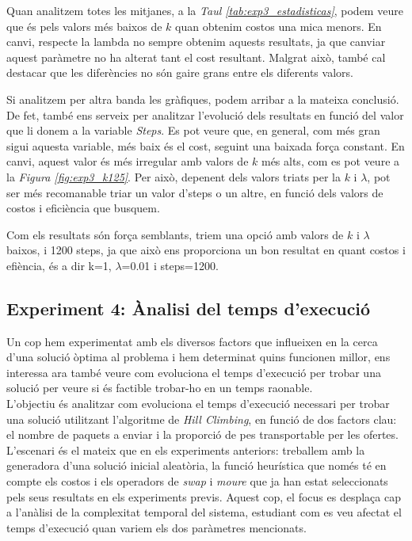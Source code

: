 \documentclass[a4paper]{article}
\begin{document}
	Quan analitzem totes les mitjanes, a la \textit{Taul \ref{tab:exp3_estadisticas}}, podem veure que és pels valors més baixos de $k$ quan obtenim costos una mica menors. En canvi, respecte la lambda no sempre obtenim aquests resultats, ja que canviar aquest paràmetre no ha alterat tant el cost resultant. Malgrat això, també cal destacar que les diferències no són gaire grans entre els diferents valors.
	
	Si analitzem per altra banda les gràfiques, podem arribar a la mateixa conclusió. De fet, també ens serveix per analitzar l'evolució dels resultats en funció del valor que li donem a la variable \textit{Steps}. Es pot veure que, en general, com més gran sigui aquesta variable, més baix és el cost, seguint una baixada força constant. En canvi, aquest valor és més irregular amb valors de $k$ més alts, com es pot veure a la \textit{Figura \ref{fig:exp3_k125}}. Per això, depenent dels valors triats per la $k$ i $\lambda$, pot ser més recomanable triar un valor d'steps o un altre, en funció dels valors de costos i eficiència que busquem.
	
	Com els resultats són força semblants, triem una opció amb valors de $k$ i $\lambda$ baixos, i 1200 steps, ja que això ens proporciona un bon resultat en quant costos i efiència, és a dir k=1, $\lambda$=0.01 i steps=1200.
	

	\subsection{Experiment 4: Ànalisi del temps d'execució}

	Un cop hem experimentat amb els diversos factors que influeixen en la cerca d'una solució òptima al problema i hem determinat quins funcionen millor, ens interessa ara també veure com evoluciona el temps d'execució per trobar una solució per veure si és factible trobar-ho en un temps raonable.\\

	L'objectiu és analitzar com evoluciona el temps d'execució necessari per trobar una solució utilitzant l'algoritme de \textit{Hill Climbing}, en funció de dos factors clau: el nombre de paquets a enviar i la proporció de pes transportable per les ofertes. \\

	L'escenari és el mateix que en els experiments anteriors: treballem amb la generadora d'una solució inicial aleatòria, la funció heurística que només té en compte els costos i els operadors de \textit{swap} i \textit{moure} que ja han estat seleccionats pels seus resultats en els experiments previs. Aquest cop, el focus es desplaça cap a l'anàlisi de la complexitat temporal del sistema, estudiant com es veu afectat el temps d'execució quan variem els dos paràmetres mencionats. \\
\end{document}
